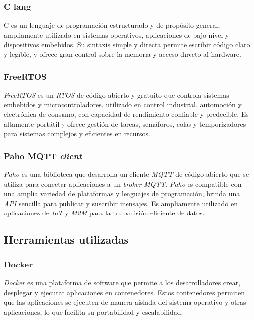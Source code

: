 \subsubsection{C lang}

C \citep{c-lang} es un lenguaje de programación estructurado y de propósito general, ampliamente utilizado en sistemas operativos, aplicaciones de bajo nivel y dispositivos embebidos. Su sintaxis simple y directa permite escribir código claro y legible, y ofrece gran control sobre la memoria y acceso directo al hardware.


\subsubsection{FreeRTOS}

\textit{FreeRTOS} \citep{free-rtos} es un \textit{RTOS} de código abierto y gratuito que controla sistemas embebidos y microcontroladores, utilizado en control industrial, automoción y electrónica de consumo, con capacidad de rendimiento confiable y predecible. Es altamente portátil y ofrece gestión de tareas, semáforos, colas y temporizadores para sistemas complejos y eficientes en recursos.


\subsubsection{Paho MQTT \textit{client}}

\textit{Paho} \citep{paho-mqtt} es una biblioteca que desarrolla un cliente \textit{MQTT} de código abierto que se utiliza para conectar aplicaciones a un \textit{broker} \textit{MQTT}. \textit{Paho} es compatible con una amplia variedad de plataformas y lenguajes de programación, brinda una \textit{API} sencilla para publicar y suscribir mensajes. Es ampliamente utilizado en aplicaciones de \textit{IoT} y \textit{M2M} para la transmisión eficiente de datos.


\subsection{Herramientas utilizadas}


\subsubsection{Docker}

\textit{Docker} \citep{docker} es una plataforma de software que permite a los desarrolladores crear, desplegar y ejecutar aplicaciones en contenedores. Estos contenedores permiten que las aplicaciones se ejecuten de manera aislada del sistema operativo y otras aplicaciones, lo que facilita su portabilidad y escalabilidad. 


